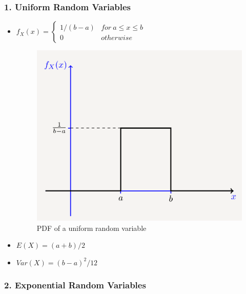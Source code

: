 \hypertarget{uniform-random-variables}{%
\subsubsection{1. Uniform Random
Variables}\label{uniform-random-variables}}

\begin{itemize}
\item
  \(f_X(x) = \begin{cases}1/(b-a) & for \ a\leq x\leq b\\0 & otherwise\end{cases}\)

  \begin{figure}[''h!'']
  \centering
  \includegraphics{Lecture 13 Notes e842fef9a3e0449fa78bac59b75dbc5c/Screenshot_from_2021-08-06_23-02-44.png}
  \caption{PDF of a uniform random variable}
  \end{figure}
\item
  \(E(X) = (a+b)/2\)
\item
  \(Var(X) = (b-a)^2/12\)
\end{itemize}

\hypertarget{exponential-random-variables}{%
\subsubsection{2. Exponential Random
Variables}\label{exponential-random-variables}}

